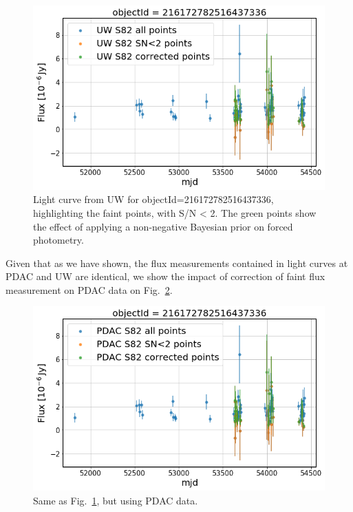 \documentclass[DM,lsstdraft,toc]{lsstdoc}
\begin{document}
\begin{figure}
\includegraphics[width=\textwidth]{figs/Single_UW_raw_LC_faint_flux}
\caption{Light curve from UW for objectId=216172782516437336, highlighting the faint points, with S/N < 2. The green points show the effect of applying a non-negative Bayesian prior on forced photometry. }
\label{fig:single_faint_flux_UW}
\end{figure}

Given that as we have shown, the flux measurements contained in light curves at PDAC and UW are identical, we show the impact of correction of faint flux measurement on PDAC data on Fig.~\ref{fig:single_faint_flux_PDAC}.

\begin{figure}
\includegraphics[width=\textwidth]{figs/Single_PDAC_raw_LC_faint_flux}
\caption{Same as Fig.~\ref{fig:single_faint_flux_UW}, but using PDAC data. }
\label{fig:single_faint_flux_PDAC}
\end{figure}
\end{document}
